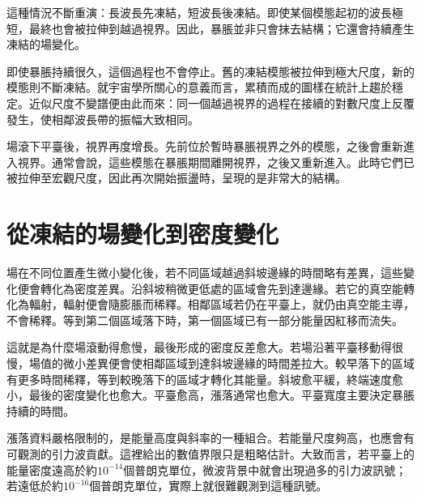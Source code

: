 這種情況不斷重演：長波長先凍結，短波長後凍結。即使某個模態起初的波長極短，最終也會被拉伸到越過視界。因此，暴脹並非只會抹去結構；它還會持續產生凍結的場變化。

即使暴脹持續很久，這個過程也不會停止。舊的凍結模態被拉伸到極大尺度，新的模態則不斷凍結。就宇宙學所關心的意義而言，累積而成的圖樣在統計上趨於穩定。近似尺度不變譜便由此而來：同一個越過視界的過程在接續的對數尺度上反覆發生，使相鄰波長帶的振幅大致相同。

場滾下平臺後，視界再度增長。先前位於暫時暴脹視界之外的模態，之後會重新進入視界。通常會說，這些模態在暴脹期間離開視界，之後又重新進入。此時它們已被拉伸至宏觀尺度，因此再次開始振盪時，呈現的是非常大的結構。

\begin{classroomqa}
\end{classroomqa}

\begin{classroomqa}
\end{classroomqa}

\section{從凍結的場變化到密度變化}

場在不同位置產生微小變化後，若不同區域越過斜坡邊緣的時間略有差異，這些變化便會轉化為密度差異。沿斜坡稍微更低處的區域會先到達邊緣。若它的真空能轉化為輻射，輻射便會隨膨脹而稀釋。相鄰區域若仍在平臺上，就仍由真空能主導，不會稀釋。等到第二個區域落下時，第一個區域已有一部分能量因紅移而流失。

這就是為什麼場滾動得愈慢，最後形成的密度反差愈大。若場沿著平臺移動得很慢，場值的微小差異便會使相鄰區域到達斜坡邊緣的時間差拉大。較早落下的區域有更多時間稀釋，等到較晚落下的區域才轉化其能量。斜坡愈平緩，終端速度愈小，最後的密度變化也愈大。平臺愈高，漲落通常也愈大。平臺寬度主要決定暴脹持續的時間。

漲落資料嚴格限制的，是能量高度與斜率的一種組合。若能量尺度夠高，也應會有可觀測的引力波貢獻。這裡給出的數值界限只是粗略估計。大致而言，若平臺上的能量密度遠高於約\(10^{-14}\)個普朗克單位，微波背景中就會出現過多的引力波訊號；若遠低於約\(10^{-16}\)個普朗克單位，實際上就很難觀測到這種訊號。

